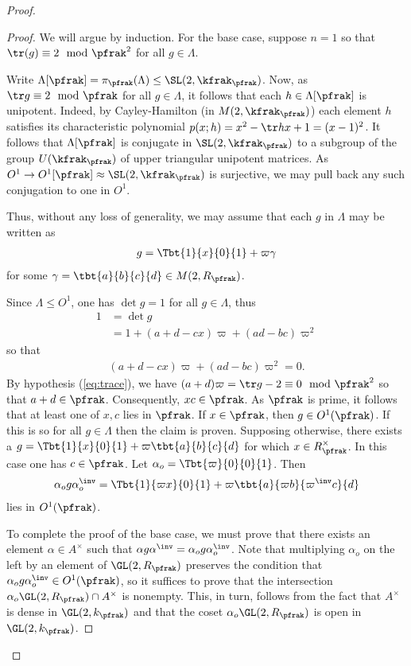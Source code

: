 \begin{proof}
\begin{proof}
    We will argue by induction. For the base case, suppose $n=1$ so that $\tr(g) \equiv 2 \mod \pfrak^2$ for all $g \in \Lambda$.


    Write $\Lambda[\pfrak] = \pi_{\pfrak}(\Lambda)\leq \SL(2,\kfrak_\pfrak)$. Now, as $\tr g \equiv 2 \mod \pfrak$ for all $g \in \Lambda$, it follows that each $h \in \Lambda[\pfrak]$ is unipotent.
    Indeed, by Cayley-Hamilton (in $M(2,\kfrak_\pfrak)$) each element $h$ satisfies its characteristic polynomial $p(x;h)=x^2 - \tr h x + 1= (x-1)^2$.
    It follows that $\Lambda[\pfrak]$ is conjugate in $\SL(2,\kfrak_\pfrak)$ to a subgroup of the group $U(\kfrak_\pfrak)$ of upper triangular unipotent matrices. As $O^1 \to O^1[\pfrak]\approx \SL(2,\kfrak_\pfrak)$ is surjective, we may pull back any such conjugation to one in $O^1$.

    Thus, without any loss of generality, we may assume that each $g$ in $\Lambda$ may be written as
    \begin{align*}
      g = \Tbt{1}{x}{0}{1} + \varpi \gamma
    \end{align*}
    for some $\gamma = \tbt{a}{b}{c}{d} \in M(2, R_\pfrak)$.

    Since $\Lambda \leq O^1$, one has $\det g = 1 $ for all $g\in \Lambda$, thus
    \begin{align*}
      1 & = \det g                                     \\
        & = 1 + (a+d - cx ) \varpi + (ad -bc) \varpi^2
    \end{align*}
    so that
    \begin{align}\label{eq:MandarinLeyden}
      (a+d - cx) \varpi + (ad-bc) \varpi^2 =0.
    \end{align}
    By hypothesis (\ref{eq:trace}), we have $(a+d)\varpi = \tr g -2 \equiv 0 \mod \pfrak^2$ so that $a+d \in \pfrak$. Consequently, $xc \in \pfrak$. As $\pfrak$ is prime, it follows that at least one of $x,c$ lies in $\pfrak$. If $x \in \pfrak$, then $g \in O^1(\pfrak)$. If this is so for all $g \in \Lambda$ then the claim is proven. Supposing otherwise, there exists a $ g = \Tbt{1}{x}{0}{1} + \varpi \tbt{a}{b}{c}{d}$ for which $x \in R_\pfrak^\times$. In this case one has $c \in \pfrak$. Let $\alpha_o = \Tbt{\varpi}{0}{0}{1}$. Then
    \begin{align*}
      \alpha_o g\alpha_o^\inv  = \Tbt{1}{\varpi x}{0}{1} + \varpi \tbt{a}{\varpi b}{\varpi^\inv c}{d}
    \end{align*}
    lies in $O^1(\pfrak)$.

    To complete the proof of the base case, we must prove that there exists an element $\alpha \in A^\times $ such that $\alpha g \alpha^\inv =  \alpha_o g \alpha_o^\inv$. Note that multiplying $\alpha_o$ on the left by an element of $\GL(2,R_\pfrak)$ preserves the condition that $\alpha_o g \alpha_o^\inv \in O^1(\pfrak)$, so it suffices to prove that the intersection $\alpha_o \GL(2,R_\pfrak) \cap A^\times $ is nonempty. This, in turn, follows from the fact that $A^\times$ is dense in $\GL(2,k_\pfrak)$ and that the coset  $\alpha_o \GL(2,R_\pfrak)$ is open in $\GL(2,k_\pfrak)$.


\end{proof}
\end{proof}

